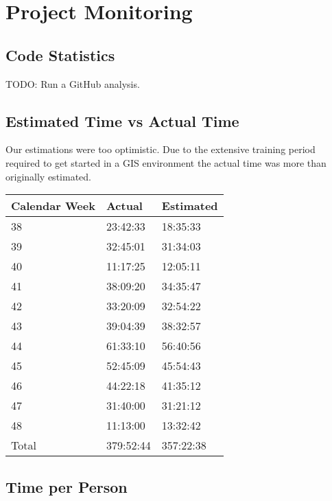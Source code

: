\chapter{Project Monitoring}\label{project monitoring}

\section{Code Statistics}

TODO: Run a GitHub analysis.


\section{Estimated Time vs Actual Time}

Our estimations were too optimistic. Due to the extensive
training period required to get started in a GIS environment
the actual time was more than originally estimated.


\begin{center}
    \begin{tabular}{lll}
    \hline
    Calendar Week & Actual & Estimated    \\
    \hline
    38     & 23:42:33         & 18:35:33          \\
    39     & 32:45:01         & 31:34:03          \\
    40     & 11:17:25         & 12:05:11          \\
    41     & 38:09:20         & 34:35:47          \\
    42     & 33:20:09         & 32:54:22          \\
    43     & 39:04:39         & 38:32:57          \\
    44     & 61:33:10         & 56:40:56          \\
    45     & 52:45:09         & 45:54:43          \\
    46     & 44:22:18         & 41:35:12          \\
    47     & 31:40:00         & 31:21:12          \\
    48     & 11:13:00         & 13:32:42          \\
    \hline
    Total & 379:52:44        & 357:22:38         \\
    \end{tabular}
\end{center}

\section{Time per Person}

